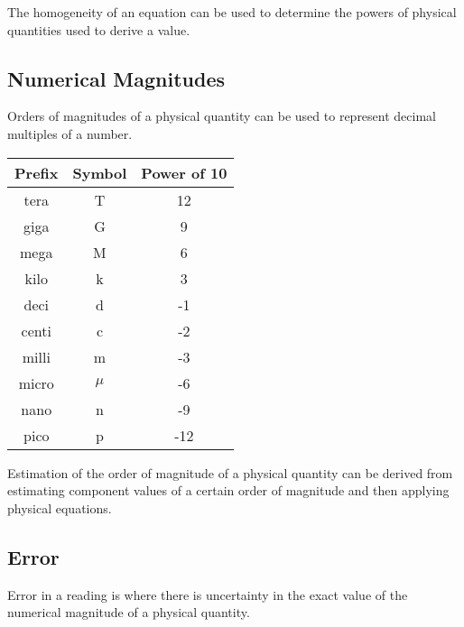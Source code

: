 \documentclass[../main]{subfiles}
\begin{document}
	The homogeneity of an equation can be used to determine the powers of physical quantities used to derive a value.

	\subsection{Numerical Magnitudes}

	Orders of magnitudes of a physical quantity can be used to represent decimal multiples of a number.

	\begin{center} \begin{tabular}{|c|c|c|} \hline
	\bf{Prefix}	&	\bf{Symbol}	&	\bf{Power of 10} \\ \hline
	tera 	&	T 	&	12	\\ \hline
	giga 	&	G 	&	9	\\ \hline
	mega 	&	M 	&	6	\\ \hline
	kilo	&	k 	&	3	\\ \hline
	deci	&	d 	&	-1	\\ \hline
	centi	&	c 	&	-2	\\ \hline
	milli	&	m 	&	-3	\\ \hline
	micro	&	\(\mu\) &	-6	\\ \hline
	nano	&	n 	&	-9	\\ \hline
	pico 	&	p 	&	-12	\\ \hline
	\end{tabular} \end{center}


	Estimation of the order of magnitude of a physical quantity can be derived from estimating component values of a certain order of magnitude and then applying physical equations.

	\subsection{Error}

	Error in a reading is where there is uncertainty in the exact value of the numerical magnitude of a physical quantity.

\end{document}
